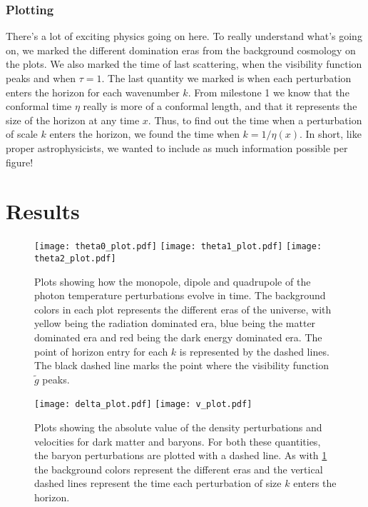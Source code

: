 \documentclass[12pt]{article}
\begin{document}
\subsubsection{Plotting}
There's a lot of exciting physics going on here. To really understand what's going on, we marked the different domination eras from the background cosmology on the plots. We also marked the time of last scattering, when the visibility function peaks and when $\tau=1$. The last quantity we marked is when each perturbation enters the horizon for each wavenumber $k$. From milestone 1 we know that the conformal time $\eta$ really is more of a conformal length, and that it represents the size of the horizon at any time $x$. Thus, to find out the time when a perturbation of scale $k$ enters the horizon, we found the time when $k=1/\eta(x)$. In short, like proper astrophysicists, we wanted to include as much information possible per figure! 

\section{Results}



\begin{figure}[h]
    \centering
    \texttt{[image: theta0\_plot.pdf]} 
    \texttt{[image: theta1\_plot.pdf]} 
    \texttt{[image: theta2\_plot.pdf]}
    \caption{Plots showing how the monopole, dipole and quadrupole of the photon temperature perturbations evolve in time. The background colors in each plot represents the different eras of the universe, with yellow being the radiation dominated era, blue being the matter dominated era and red being the dark energy dominated era. The point of horizon entry for each $k$ is represented by the dashed lines. The black dashed line marks the point where the visibility function $\tilde{g}$ peaks.}
    \label{fig:theta}
\end{figure}

\begin{figure}[h]
    \centering
    \texttt{[image: delta\_plot.pdf]} 
    \texttt{[image: v\_plot.pdf]} 
    \caption{Plots showing the absolute value of the density perturbations and velocities for dark matter and baryons. For both these quantities, the baryon perturbations are plotted with a dashed line. As with \cref{fig:theta} the background colors represent the different eras and the vertical dashed lines represent the time each perturbation of size $k$ enters the horizon.}
    \label{fig:delta_v}
\end{figure}
\end{document}
